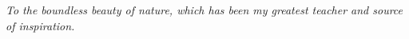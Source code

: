 \hfill
\vfill
\hfill{\it{To the boundless beauty of nature, which has been my greatest teacher and source of inspiration.}}
\vspace{2cm}